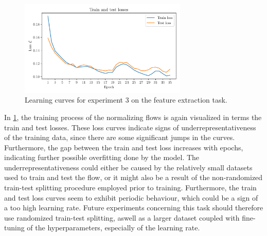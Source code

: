 \documentclass[a4paper,12pt]{report}
\begin{document}
\begin{figure}[h!]
\centering
\includegraphics[width=8cm]{figures/nf-feature-extraction-example-3-loss.pdf}
\caption{Learning curves for experiment 3 on the feature extraction task.}
\label{fig:nf-feature-extraction-example-3-loss}
\end{figure}
In \cref{fig:nf-feature-extraction-example-3-loss}, the training process of the normalizing flows is again visualized in terms the train and test losses. These loss curves indicate signs of underrepresentativeness of the training data, since there are some significant jumps in the curves. Furthermore, the gap between the train and test loss increases with epochs, indicating further possible overfitting done by the model. The underrepresentativeness could either be caused by the relatively small datasets used to train and test the flow, or it might also be a result of the non-randomized train-test splitting procedure employed prior to training. Furthermore, the train and test loss curves seem to exhibit periodic behaviour, which could be a sign of a too high learning rate. Future experiments concerning this task should therefore use randomized train-test splitting, aswell as a larger dataset coupled with fine-tuning of the hyperparameters, especially of the learning rate.
\end{document}
